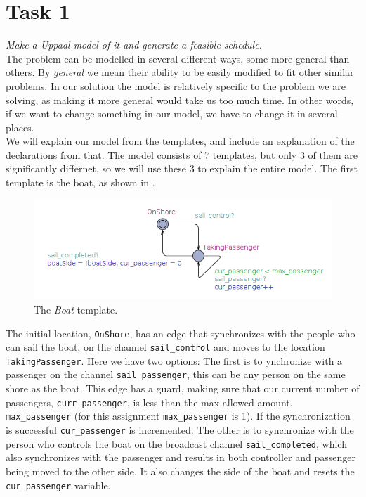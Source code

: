 \section{Task 1}
\label{sec:task1}
\textit{Make a Uppaal model of it and generate a feasible schedule.}\\
The problem can be modelled in several different ways, some more general than others. By \textit{general} we mean their ability to be easily modified to fit other similar problems. In our solution the model is relatively specific to the problem we are solving, as making it more general would take us too much time. In other words, if we want to change something in our model, we have to change it in several places.\\

We will explain our model from the templates, and include an explanation of the declarations from that. The model consists of 7 templates, but only 3 of them are significantly differnet, so we will use these 3 to explain the entire model. The first template is the boat, as shown in .

\begin{figure}[H] \centering
	\includegraphics[width=1\textwidth]{Images/boat.png}
	\caption{The \textit{Boat} template.}\label{fig:boat}
\end{figure} 

\noindent The initial location, \texttt{OnShore}, has an edge that synchronizes with the people who can sail the boat, on the channel \texttt{sail_control} and moves to the location \texttt{TakingPassenger}. Here we have two options: The first is to ynchronize with a passenger on the channel \texttt{sail_passenger}, this can be any person on the same shore as the boat. This edge has a guard, making sure that our current number of passengers, \texttt{curr_passenger}, is less than the max allowed amount, \texttt{max_passenger} (for this assignment \texttt{max_passenger} is 1). If the synchronization is successful \texttt{cur_passenger} is incremented. The other is to synchronize with the person who controls the boat on the broadcast channel \texttt{sail_completed}, which also synchronizes with the passenger and results in both controller and passenger being moved to the other side. It also changes the side of the boat and resets the \texttt{cur_passenger} variable.


